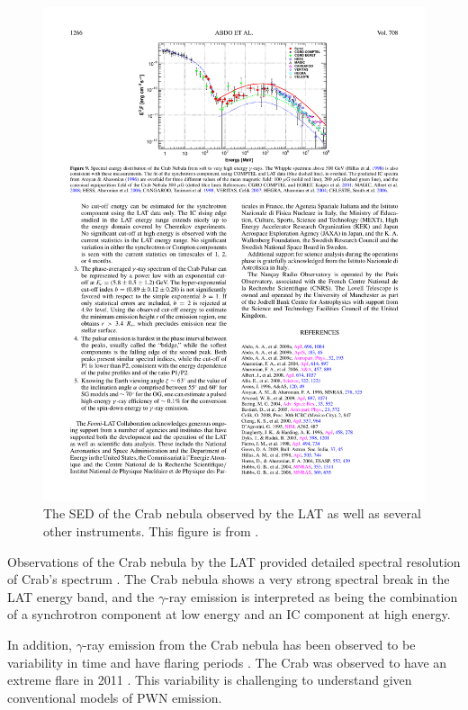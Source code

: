 \begin{figure}[htbp]
  \centering
    \includegraphics{chapters/introduction/figures/crab_spectrum.pdf}
  \caption{
    The \ac{SED} of the Crab nebula observed by the \ac{LAT} as
    well as several other instruments.
    This figure is from \cite{abdo_2010a_fermi-large}.
  }
\end{figure}

Observations of the Crab nebula by the
\ac{LAT} provided detailed spectral resolution of Crab's spectrum
\cite{abdo_2010a_fermi-large}.  The Crab nebula shows a very strong
spectral break in the \ac{LAT} energy band, and the $\gamma$-ray emission
is interpreted as being the combination of a synchrotron component at low
energy and an \ac{IC} component at high energy.

In addition, $\gamma$-ray emission from the Crab nebula has
been observed to be variability in time and have flaring periods
\citep{abdo_2011a_gamma-ray-flares}.  The Crab was observed to have
an extreme flare in 2011 \citep{buehler_2012a_gamma-ray-activity}.
This variability is challenging to understand given conventional models
of \ac{PWN} emission.

